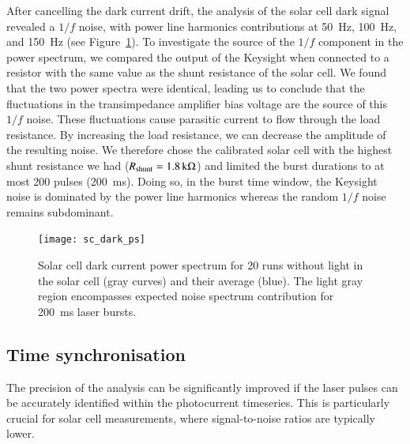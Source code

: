After cancelling the dark current drift, the analysis of the solar cell dark signal revealed a $1/f$ noise, with power line harmonics contributions at \SI{50}{\hertz},  \SI{100}{\hertz}, and \SI{150}{\hertz} (see Figure~\ref{fig:darkcurrentspectrum}). To investigate the source of the $1/f$ component in the power spectrum, we compared the output of the Keysight when connected to a resistor with the same value as the shunt resistance of the solar cell. We found that the two power spectra were identical, leading us to conclude that the fluctuations in the transimpedance amplifier bias voltage are the source of this $1/f$ noise. These fluctuations cause parasitic current to flow through the load resistance. By increasing the load resistance, we can decrease the amplitude of the resulting noise. We therefore chose the calibrated solar cell with the highest shunt resistance we had ($R_{\rm shunt} = \SI{1.8}{\kilo\ohm}$) and limited the burst durations to at most 200 pulses (\SI{200}{\ms}). Doing so, in the burst time window, the Keysight noise is dominated by the power line harmonics whereas the random $1/f$ noise remains subdominant.

\begin{figure}[h]
\begin{center}
\texttt{[image: sc\_dark\_ps]}
\end{center}
\caption[]{Solar cell dark current power spectrum for 20 runs without light in the solar cell (gray curves) and their average (blue). The light gray region encompasses expected noise spectrum contribution for \SI{200}{\ms} laser bursts.}
\label{fig:darkcurrentspectrum}
\end{figure}

\FloatBarrier   

\subsection{Time synchronisation}
\label{sec:synchro}

The precision of the analysis can be significantly improved if the laser pulses can be accurately identified within the photocurrent timeseries. This is particularly crucial for solar cell measurements, where signal-to-noise ratios are typically lower.


